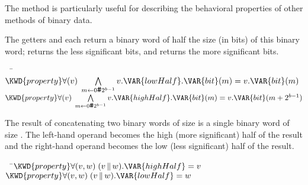 The  method is particularly useful for describing the behavioral properties of
other methods of binary data.



The getters  and  each return a binary word of half the size (in bits)
of this binary word;  returns the less significant bits, and  returns
the more significant bits.

\begin{Fortress}
{\tt~~}\pushtabs\=\+\(  \KWD{property} \forall(v)\; \bigwedge\limits_{m\leftarrow{}0\mathinner{\hbox{\tt\char'43}}2^{b-1}} v.\VAR{lowHalf}.\VAR{bit}(m) = v.\VAR{bit}(m)\)\\
\(  \KWD{property} \forall(v)\; \bigwedge\limits_{m\leftarrow{}0\mathinner{\hbox{\tt\char'43}}2^{b-1}} v.\VAR{highHalf}.\VAR{bit}(m) = v.\VAR{bit}(m+2^{b-1})\)\-\\\poptabs
\end{Fortress}



The result of concatenating two binary words of size  is a single binary
word of size .  The left-hand operand becomes the high (more significant) half of the result
and the right-hand operand becomes the low (less significant) half of the result.

\begin{Fortress}
{\tt~~}\pushtabs\=\+\(  \KWD{property} \forall (v,w)\; (v\,\|\,w).\VAR{highHalf} = v\)\\
\(  \KWD{property} \forall (v,w)\; (v\,\|\,w).\VAR{lowHalf} = w\)\-\\\poptabs
\end{Fortress}


